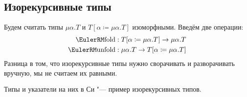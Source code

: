 \subsection*{\texorpdfstring{Изорекурсивные типы}{Isorecursive types}}
Будем считать типы $\mu \alpha . T$ и $T[\alpha \coloneqq \mu \alpha.T]$ изоморфными.
Введём две операции:
\begin{align*}
    \func{fold}   &: T[\alpha \coloneqq \mu \alpha.T] \to \mu \alpha . T \\
    \func{unfold} &: \mu \alpha . T \to T[\alpha \coloneqq \mu \alpha.T]
\end{align*}
Разница в том, что изорекурсивные типы нужно сворачивать и разворачивать вручную, мы не считаем их равными.

Типы и указатели на них в Си "--- пример изорекурсивных типов.
